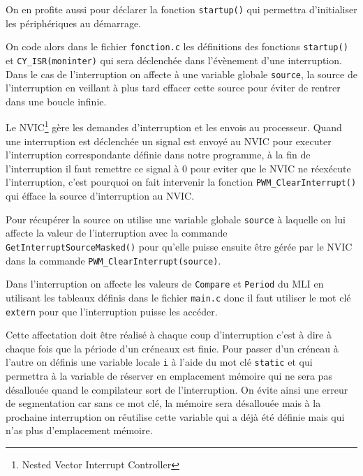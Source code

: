 \documentclass[11pt, openright]{book}
\begin{document}
On en profite aussi pour déclarer la fonction \texttt{startup()} qui permettra d'initialiser les périphériques au démarrage.

On code alors dans le fichier \texttt{fonction.c} les définitions des fonctions \texttt{startup()} et \texttt{CY\_ISR(moninter)} qui sera déclenchée dans l'évènement d'une interruption. Dans le cas de l'interruption on affecte à une variable globale \texttt{source}, la source de l'interruption en veillant à plus tard effacer cette source pour éviter de rentrer dans une boucle infinie.

Le NVIC\footnote{Nested Vector Interrupt Controller} gère les demandes d'interruption et les envois au processeur. Quand une interruption est déclenchée un signal est envoyé au NVIC pour executer l'interruption correspondante définie dans notre programme, à la fin de l'interruption il faut remettre ce signal à 0 pour eviter que le NVIC ne réexécute l'interruption, c'est pourquoi on fait intervenir la fonction \texttt{PWM\_ClearInterrupt()} qui éfface la source d'interruption au NVIC.

Pour récupérer la source on utilise une variable globale \texttt{source} à laquelle on lui affecte la valeur de l'interruption avec la commande \texttt{GetInterruptSourceMasked()} pour qu'elle puisse ensuite être gérée par le NVIC dans la commande \texttt{PWM\_ClearInterrupt(source)}.

Dans l'interruption on affecte les valeurs de \texttt{Compare} et \texttt{Period} du MLI en utilisant les tableaux définis dans le fichier \texttt{main.c} donc il faut utiliser le mot clé \texttt{extern} pour que l'interruption puisse les accéder.

Cette affectation doit être réalisé à chaque coup d'interruption c'est à dire à chaque fois que la période d'un créneaux est finie. Pour passer d'un créneau à l'autre on définis une variable locale \texttt{i} à l'aide du mot clé \texttt{static} et qui permettra à la variable de réserver en emplacement mémoire qui ne sera pas désallouée quand le compilateur sort de l'interruption. On évite ainsi une erreur de segmentation car sans ce mot clé, la mémoire sera désallouée mais à la prochaine interruption on réutilise cette variable qui a déjà été définie mais qui n'as plus d'emplacement mémoire.
\end{document}
